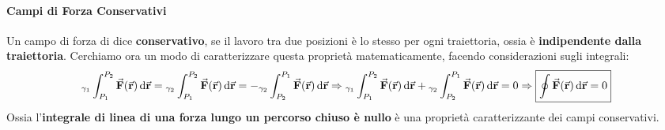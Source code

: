 \documentclass{report}
\newcommand{\then}{\ensuremath{\Rightarrow}}
\renewcommand{\r}{\va{r}}
\newcommand{\F}{\va{F}}
\begin{document}
\paragraph{Campi di Forza Conservativi}
Un campo di forza di dice \textbf{conservativo}, se il lavoro tra due posizioni è lo stesso per ogni traiettoria, ossia è \textbf{indipendente dalla traiettoria}. Cerchiamo ora un modo di caratterizzare questa proprietà matematicamente, facendo considerazioni sugli integrali:
\[{}_{\gamma_1}\int_{P_1}^{P_2}\F(\r)\dif\r={}_{\gamma_2}\int_{P_1}^{P_2}\F(\r)\dif\r=-{}_{\gamma_2}\int_{P_2}^{P_1}\F(\r)\dif\r\then {}_{\gamma_1}\int_{P_1}^{P_2}\F(\r)\dif\r+{}_{\gamma_2}\int_{P_2}^{P_1}\F(\r)\dif\r=0\then\boxed{\oint\F(\r)\dif\r=0}\]
Ossia l'\textbf{integrale di linea di una forza lungo un percorso chiuso è nullo} è una proprietà caratterizzante dei campi conservativi. 
\end{document}
